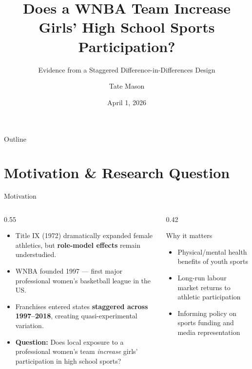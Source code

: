 \documentclass[aspectratio=169, 12pt]{beamer}
\title[WNBA \& Girls' Sports]{Does a WNBA Team Increase \\ Girls' High School Sports Participation?}
\subtitle{Evidence from a Staggered Difference-in-Differences Design}
\author[Tate Mason]{Tate Mason}
\institute[UGA]{Department of Economics \\ University of Georgia}
\date{April 1, 2026}
\newcommand{\red}[1]{{\color{wnbared}\textbf{#1}}}
\newcommand{\navy}[1]{{\color{navydark}\textbf{#1}}}
\begin{document}

\begin{frame}
  \titlepage
\end{frame}

\begin{frame}{Outline}
  \tableofcontents
\end{frame}

\section{Motivation \& Research Question}

\begin{frame}{Motivation}
  \begin{columns}[T]
    \begin{column}{0.55\textwidth}
      \begin{itemize}
        \item Title IX (1972) dramatically expanded female athletics, but \red{role-model effects} remain understudied.
        \vspace{0.4em}
        \item WNBA founded 1997 — first major professional women's basketball league in the US.
        \vspace{0.4em}
        \item Franchises entered states \textbf{staggered across 1997--2018}, creating quasi-experimental variation.
        \vspace{0.4em}
        \item \navy{Question:} Does local exposure to a professional women's team \emph{increase} girls' participation in high school sports?
      \end{itemize}
    \end{column}
    \begin{column}{0.42\textwidth}
      \begin{block}{Why it matters}
        \small
        \begin{itemize}
          \item Physical/mental health benefits of youth sports
          \item Long-run labour market returns to athletic participation
          \item Informing policy on sports funding and media representation
        \end{itemize}
      \end{block}
    \end{column}
  \end{columns}
\end{frame}
\end{document}
